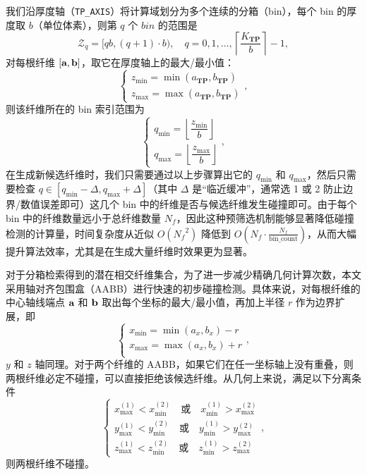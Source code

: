 我们沿厚度轴（\texttt{TP\_AXIS}）将计算域划分为多个连续的分箱（bin），每个 bin 的厚度取 $b$（单位体素），则第 $q$ 个 $bin$ 的范围是
\begin{equation}
\mathcal{Z}_q = [qb, (q+1) \cdot b), \quad q=0,1,\ldots,\left\lceil \dfrac{K_{\textbf{TP}}}{b} \right\rceil - 1,
\end{equation}
对每根纤维 $[\textbf a,\textbf b]$，取它在厚度轴上的最大/最小值：
\begin{equation}
\begin{cases}
z_{\min} = \min(a_{\textbf{TP}}, b_{\textbf{TP}}) \\
z_{\max} = \max(a_{\textbf{TP}}, b_{\textbf{TP}})
\end{cases}
,
\end{equation}
则该纤维所在的 bin 索引范围为
\begin{equation}
\begin{cases}
q_{\min} = \left\lfloor \dfrac{z_{\min}}{b} \right\rfloor \\
q_{\max} = \left\lfloor \dfrac{z_{\max}}{b} \right\rfloor
\end{cases}
,
\end{equation}
在生成新候选纤维时，我们只需要通过以上步骤算出它的 $q_{\min}$ 和 $q_{\max}$，然后只需要检查 $q \in [q_{\min} - \Delta, q_{\max} + \Delta]$（其中 $\Delta$ 是“临近缓冲”，通常选 1 或 2 防止边界/数值误差即可）这几个 bin 中的纤维是否与候选纤维发生碰撞即可。由于每个 bin 中的纤维数量远小于总纤维数量 $N_f$，因此这种预筛选机制能够显著降低碰撞检测的计算量，时间复杂度从近似 $O({N_f}^2)$ 降低到 $O(N_f \cdot \frac{N_f}{\text{bin\_count}})$，从而大幅提升算法效率，尤其是在生成大量纤维时效果更为显著。

对于分箱检索得到的潜在相交纤维集合，为了进一步减少精确几何计算次数，本文采用轴对齐包围盒（AABB）进行快速的初步碰撞检测。具体来说，对每根纤维的中心轴线端点 $\textbf a$ 和 $\textbf b$ 取出每个坐标的最大/最小值，再加上半径 $r$ 作为边界扩展，即
\begin{equation}
\begin{cases}
x_{\min} = \min(a_x, b_x) - r \\
x_{\max} = \max(a_x, b_x) + r \\
\end{cases}
,
\end{equation}
$y$ 和 $z$ 轴同理。对于两个纤维的 AABB，如果它们在任一坐标轴上没有重叠，则两根纤维必定不碰撞，可以直接拒绝该候选纤维。从几何上来说，满足以下分离条件
\begin{equation}
\begin{cases}
x_{\max}^{(1)} < x_{\min}^{(2)} \quad \text{或} \quad x_{\min}^{(1)} > x_{\max}^{(2)} \\
y_{\max}^{(1)} < y_{\min}^{(2)} \quad \text{或} \quad y_{\min}^{(1)} > y_{\max}^{(2)} \\
z_{\max}^{(1)} < z_{\min}^{(2)} \quad \text{或} \quad z_{\min}^{(1)} > z_{\max}^{(2)}
\end{cases}
,
\end{equation}
则两根纤维不碰撞。

